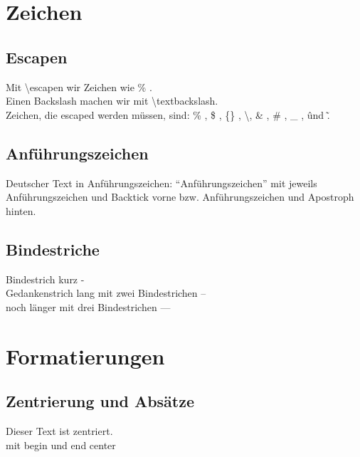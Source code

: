 \section{Zeichen}

\subsection{Escapen}
Mit \textbackslash       escapen wir Zeichen wie \% . \\
Einen Backslash machen wir mit \textbackslash textbackslash. \\ 
Zeichen, die escaped werden müssen, sind: \% , \$ , \{\} , \textbackslash,
\& , \# , \_ , \^ und \~ . \\

\subsection{Anführungszeichen}

Deutscher Text in Anführungszeichen: "`Anführungszeichen"' mit 
jeweils Anführungszeichen und Backtick vorne bzw. Anführungszeichen 
und Apostroph hinten. \\


\subsection{Bindestriche}


Bindestrich kurz - \\
Gedankenstrich lang mit zwei Bindestrichen -- \\
noch länger mit drei Bindestrichen --- \\

\section{Formatierungen}

\subsection{Zentrierung und Absätze}


\begin{center}
    \large
    Dieser Text ist zentriert. \\
    \tiny
    mit begin und end center
\end{center} 


